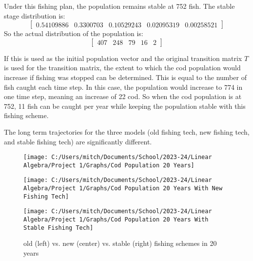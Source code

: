\documentclass{article}
\begin{document}
    Under this fishing plan, the population remains stable at 752 fish.
    The stable stage distribution is:
    \begin{equation}
        \begin{bmatrix}
            0.54109886 & 0.3300703 & 0.10529243 & 0.02095319 & 0.00258521
        \end{bmatrix}\label{eq:equation22}
    \end{equation}
    So the actual distribution of the population is:
    \begin{equation}
        \begin{bmatrix}
            407 & 248 & 79 & 16 & 2
        \end{bmatrix}\label{eq:equation23}
    \end{equation}

    If this is used as the initial population vector and the original transition matrix $T$ is used for the transition matrix, the extent to which the cod population would increase if fishing was stopped can be determined.
    This is equal to the number of fish caught each time step.
    In this case, the population would increase to 774 in one time step, meaning an increase of 22 cod.
    So when the cod population is at 752, 11 fish can be caught per year while keeping the population stable with this fishing scheme.

    The long term trajectories for the three models (old fishing tech, new fishing tech, and stable fishing tech) are significantly different.
    \begin{figure} [!h]
        \begin{minipage}{0.3333\linewidth}
            \centering
            \texttt{[image: C:/Users/mitch/Documents/School/2023-24/Linear Algebra/Project 1/Graphs/Cod Population 20 Years]}
        \end{minipage}\hfill
        \begin{minipage}{0.3333\linewidth}
            \centering
            \texttt{[image: C:/Users/mitch/Documents/School/2023-24/Linear Algebra/Project 1/Graphs/Cod Population 20 Years With New Fishing Tech]}
        \end{minipage}\hfill
        \begin{minipage}{0.3333\linewidth}
            \centering
            \texttt{[image: C:/Users/mitch/Documents/School/2023-24/Linear Algebra/Project 1/Graphs/Cod Population 20 Years With Stable Fishing Tech]}
        \end{minipage}
        \caption{old (left) vs. new (center) vs. stable (right) fishing schemes in 20 years}
        \label{fig:old_new_stable}
    \end{figure}
\end{document}
